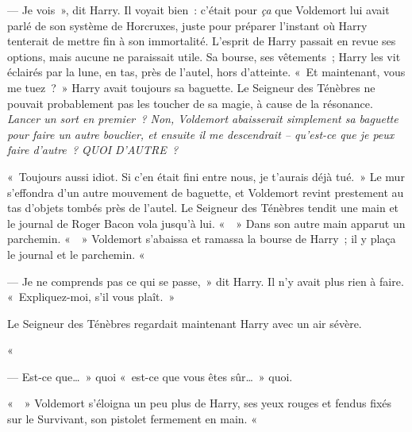--- Je vois~», dit Harry. Il voyait bien~: c'était pour \emph{ça} que Voldemort lui avait parlé de son système de Horcruxes, juste pour préparer l'instant où Harry tenterait de mettre fin à son immortalité. L'esprit de Harry passait en revue ses options, mais aucune ne paraissait utile. Sa bourse, ses vêtements~; Harry les vit éclairés par la lune, en tas, près de l'autel, hors d'atteinte. «~Et maintenant, vous me tuez~?~» Harry avait toujours sa baguette. Le Seigneur des Ténèbres ne pouvait probablement pas les toucher de sa magie, à cause de la résonance. \emph{Lancer un sort en premier~? Non, Voldemort abaisserait simplement sa baguette pour faire un autre bouclier, et ensuite il me descendrait -- qu'est-ce que je peux faire d'autre~? QUOI D'AUTRE~?}

«~Toujours aussi idiot. Si c'en était fini entre nous, je t'aurais déjà tué.~» Le mur s'effondra d'un autre mouvement de baguette, et Voldemort revint prestement au tas d'objets tombés près de l'autel. Le Seigneur des Ténèbres tendit une main et le journal de Roger Bacon vola jusqu'à lui. «~~» Dans son autre main apparut un parchemin. «~~» Voldemort s'abaissa et ramassa la bourse de Harry~; il y plaça le journal et le parchemin. «~

--- Je ne comprends pas ce qui se passe,~» dit Harry. Il n'y avait plus rien à faire. «~Expliquez-moi, s'il vous plaît.~»

Le Seigneur des Ténèbres regardait maintenant Harry avec un air sévère.

«~

--- Est-ce que…~» quoi «~est-ce que vous êtes sûr…~» quoi.

«~~» Voldemort s'éloigna un peu plus de Harry, ses yeux rouges et fendus fixés sur le Survivant, son pistolet fermement en main. «~

